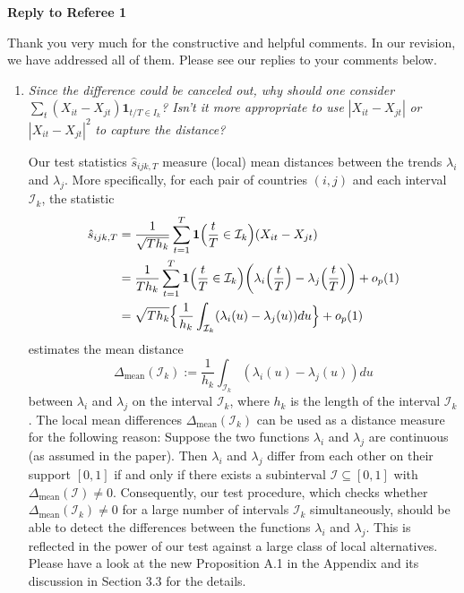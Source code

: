 \documentclass[a4paper,12pt]{article}
\begin{document}
\newpage
\begin{center}
{\large \bf Reply to Referee 1} 
\end{center}


Thank you very much for the constructive and helpful comments. In our revision, we have addressed all of them. Please see our replies to your comments below.


\begin{enumerate}[label=(\arabic*),leftmargin=0.7cm]


\item \textit{Since the difference could be canceled out, why should one consider} $\sum\nolimits_t (X_{it} - X_{jt})\mathbf{1}_{t/T \in I_k}$\textit{? Isn't it more appropriate to use} $|X_{it} - X_{jt}|$ \textit{ or } $|X_{it} - X_{jt}|^2$ \textit{to capture the distance?}

Our test statistics $\hat{s}_{ijk,T}$ measure (local) mean distances between the trends $\lambda_i$ and $\lambda_j$. More specifically, for each pair of countries $(i,j)$ and each interval $\mathcal{I}_k$, the statistic
\begin{align*} 
\hat{s}_{ijk,T} 
 & = \frac{1}{\sqrt{Th_k}} \sum\limits_{t=1}^T \boldsymbol{1}\Big(\frac{t}{T} \in \mathcal{I}_k\Big) (X_{it} - X_{jt}) \\
 & = \frac{1}{Th_k} \sum\limits_{t=1}^T \boldsymbol{1}\Big(\frac{t}{T} \in \mathcal{I}_k\Big) \bigg( \lambda_i \Big(\frac{t}{T}\Big)  - \lambda_j \Big(\frac{t}{T}\Big)\bigg) + o_p(1) \\
 & = \sqrt{Th_k} \Big\{ \frac{1}{h_k} \int_{\mathcal{I}_k} (\lambda_i(u) - \lambda_j(u)) du \Big\} + o_p(1) 
\end{align*}
estimates the mean distance 
\[ \Delta_{\text{mean}}(\mathcal{I}_k) := \frac{1}{h_k} \int_{\mathcal{I}_k} (\lambda_i(u) - \lambda_j(u)) du \]
between $\lambda_i$ and $\lambda_j$ on the interval $\mathcal{I}_k$, where $h_k$ is the length of the interval $\mathcal{I}_k$. The local mean differences $\Delta_{\text{mean}}(\mathcal{I}_k)$ can be used as a distance measure for the following reason: Suppose the two functions $\lambda_i$ and $\lambda_j$ are continuous (as assumed in the paper). Then $\lambda_i$ and $\lambda_j$ differ from each other on their support $[0,1]$ if and only if there exists a subinterval $\mathcal{I} \subseteq [0,1]$ with $\Delta_{\text{mean}}(\mathcal{I}) \ne 0$. Consequently, our test procedure, which checks whether $\Delta_{\text{mean}}(\mathcal{I}_k) \ne 0$ for a large number of intervals $\mathcal{I}_k$ simultaneously, should be able to detect the differences between the functions $\lambda_i$ and $\lambda_j$. This is reflected in the power of our test against a large class of local alternatives. Please have a look at the new Proposition A.1 in the Appendix and its discussion in Section 3.3 for the details.


\end{enumerate}
\end{document}
